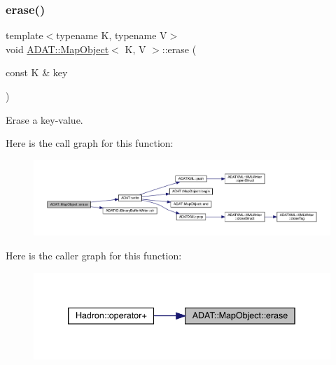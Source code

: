 \subsubsection{\texorpdfstring{erase()}{erase()}\hspace{0.1cm}{\footnotesize\ttfamily [2/2]}}
{\footnotesize\ttfamily template$<$typename K, typename V$>$ \\
void \mbox{\hyperlink{classADAT_1_1MapObject}{A\+D\+A\+T\+::\+Map\+Object}}$<$ K, V $>$\+::erase (\begin{DoxyParamCaption}\item[{const K \&}]{key }\end{DoxyParamCaption})\hspace{0.3cm}{\ttfamily [inline]}}



Erase a key-\/value. 

Here is the call graph for this function\+:
\nopagebreak
\begin{figure}[H]
\begin{center}
\leavevmode
\includegraphics[width=350pt]{da/d29/classADAT_1_1MapObject_aa93bbf650a37c70e91904c9e7566eb6f_cgraph}
\end{center}
\end{figure}
Here is the caller graph for this function\+:\nopagebreak
\begin{figure}[H]
\begin{center}
\leavevmode
\includegraphics[width=339pt]{da/d29/classADAT_1_1MapObject_aa93bbf650a37c70e91904c9e7566eb6f_icgraph}
\end{center}
\end{figure}
\mbox{\label{classADAT_1_1MapObject_a1d22f979e34bda97c3dc89d5fc937d3b}} 
